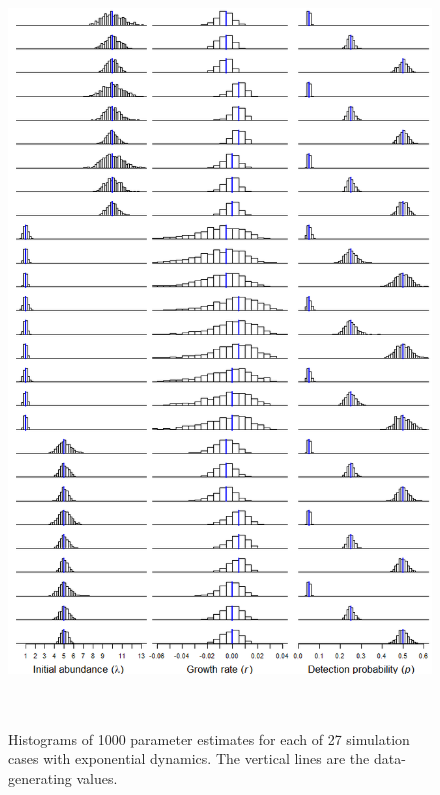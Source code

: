 \documentclass[12pt]{article}
\begin{document}
\newpage




\begin{figure}
  \centering
  \includegraphics[height=8in]{figs/exp_hists}
\caption{Histograms of 1000 parameter estimates for each of 27
simulation cases with exponential dynamics. The vertical lines are the 
data-generating values.}
\label{fig:exp_hists}
\end{figure}
\end{document}
